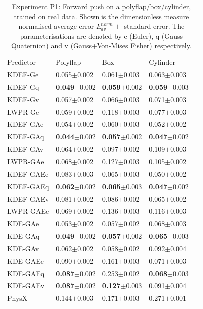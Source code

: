 \begin{table}[t]
\begin{center}
\begin{tabular}{|l|l|l|l|l|}
\cline{1-4}
Predictor & Polyflap & Box & Cylinder \\
\cline{1-4}
KDEF-Ge & 0.055$\pm$0.002 & 0.061$\pm$0.003 & 0.063$\pm$0.003\\
KDEF-Gq  & \textbf{0.049}$\pm$0.002 & \textbf{0.059}$\pm$0.002 & \textbf{0.059}$\pm$0.003\\
KDEF-Gv   & 0.057$\pm$0.002 & 0.066$\pm$0.003 & 0.071$\pm$0.003\\
LWPR-Ge &  0.059$\pm$0.002 & 0.118$\pm$0.003 & 0.077$\pm$0.003\\
\cline{1-4}
KDEF-GAe & 0.054$\pm$0.002 & 0.060$\pm$0.003 & 0.052$\pm$0.002\\
KDEF-GAq & \textbf{0.044}$\pm$0.002 & \textbf{0.057}$\pm$0.002 & \textbf{0.047}$\pm$0.002\\
KDEF-GAv  & 0.064$\pm$0.002 & 0.097$\pm$0.002  & 0.109$\pm$0.003 \\
LWPR-GAe & 0.068$\pm$0.002 & 0.127$\pm$0.003 & 0.105$\pm$0.002 \\
\cline{1-4}
KDEF-GAEe & 0.083$\pm$0.003 & 0.065$\pm$0.003 & 0.050$\pm$0.002 \\
KDEF-GAEq & \textbf{0.062}$\pm$0.002 & \textbf{0.065}$\pm$0.003 & \textbf{0.047}$\pm$0.002\\
KDEF-GAEv & 0.081$\pm$0.002 & 0.086$\pm$0.002 & 0.065$\pm$0.002\\
LWPR-GAEe & 0.069$\pm$0.002 & 0.136$\pm$0.003 & 0.116$\pm$0.003\\
\cline{1-4}
KDE-GAe & 0.053$\pm$0.002 & 0.057$\pm$0.002 & 0.068$\pm$0.003 \\
KDE-GAq  & \textbf{0.049}$\pm$0.002 & \textbf{0.057}$\pm$0.002 & \textbf{0.065}$\pm$0.003\\
KDE-GAv   & 0.062$\pm$0.002 & 0.058$\pm$0.002 & 0.092$\pm$0.004\\
\cline{1-4}
KDE-GAEe & 0.090$\pm$0.002 & 0.161$\pm$0.003 & 0.071$\pm$0.003\\
KDE-GAEq  & \textbf{0.087}$\pm$0.002 & 0.253$\pm$0.002 & \textbf{0.068}$\pm$0.003\\
KDE-GAEv   & \textbf{0.087}$\pm$0.002 & \textbf{0.127}$\pm$0.003 & 0.091$\pm$0.004\\
\cline{1-4}
PhysX & 0.144$\pm$0.003 &  0.171$\pm$0.003 & 0.271$\pm$0.001\\
\cline{1-4}
\end{tabular}
\caption[Performance Table]{Experiment P1: Forward push on a
  polyflap/box/cylinder, trained on real data. Shown is the dimensionless measure normalised average error  ${E_{av}^{norm}} \pm$ standard error. The parameterisations are denoted by e (Euler), q (Gauss Quaternion) and v (Gauss+Von-Mises Fisher) respectively. \label{tab:PerformanceTableL1av}
}
\end{center}
\end{table}  

